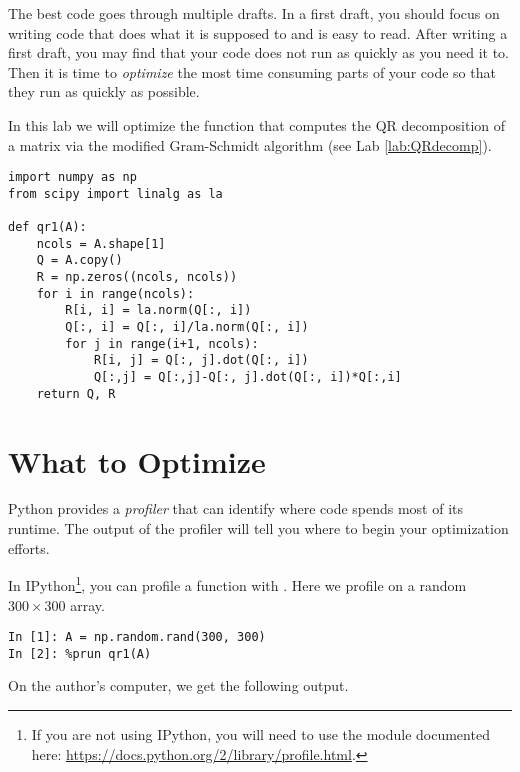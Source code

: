 \label{lab:ProfilingCode}

The best code goes through multiple drafts.
In a first draft, you should focus on writing code that does what it is supposed
to and is easy to read. After writing a first draft, you may find that your code
does not run as quickly as you need it to. Then it is time to \emph{optimize}
the most time consuming parts of your code so that they run as quickly as possible.

In this lab we will optimize the function  that computes the QR
decomposition of a matrix via the modified Gram-Schmidt algorithm
(see Lab \ref{lab:QRdecomp}).

\begin{lstlisting}
import numpy as np
from scipy import linalg as la

def qr1(A):
    ncols = A.shape[1]
    Q = A.copy()
    R = np.zeros((ncols, ncols))
    for i in range(ncols):
        R[i, i] = la.norm(Q[:, i])
        Q[:, i] = Q[:, i]/la.norm(Q[:, i])
        for j in range(i+1, ncols):
            R[i, j] = Q[:, j].dot(Q[:, i])
            Q[:,j] = Q[:,j]-Q[:, j].dot(Q[:, i])*Q[:,i]
    return Q, R
\end{lstlisting}

\section*{What to Optimize}
Python provides a \emph{profiler} that can identify where code spends most of
its runtime. The output of the profiler will tell you where to begin your
optimization efforts.

In IPython\footnote{If you are not using IPython, you will need to use the
 module documented here: \url{https://docs.python.org/2/library/profile.html}.},
you can profile a function with .
Here we profile  on a random $300 \times 300$ array.

\begin{lstlisting}
In [1]: A = np.random.rand(300, 300)
In [2]: %prun qr1(A)
\end{lstlisting}

On the author's computer, we get the following output.

